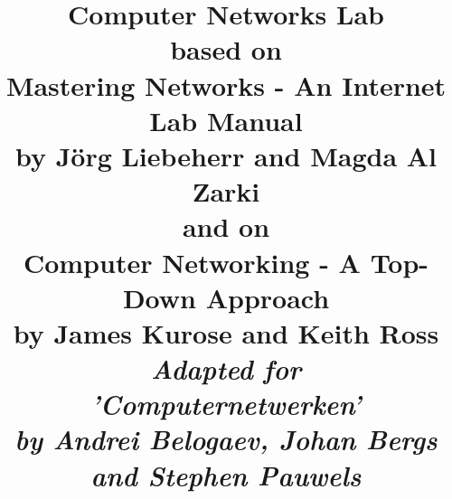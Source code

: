 \usepackage{a4wide}
\usepackage[printonlyused]{acronym}
\usepackage{amsmath}
\usepackage{amssymb}
\usepackage{array}
\usepackage{boxedminipage}
\usepackage{calc}
\usepackage{cite}
\usepackage{color}
\usepackage[inline]{enumitem}
\usepackage{fancyvrb}
\usepackage[draft]{fixme}
\usepackage[T1]{fontenc}
\usepackage{framed}
\usepackage{ifthen}
\usepackage{xifthen}
\usepackage{forloop}
\usepackage[pdftex]{graphicx}
\usepackage{helvet}
\usepackage[colorlinks,linkcolor=black,urlcolor=blue]{hyperref}
\usepackage{listings}
\usepackage{longtable}
\usepackage{ifthen}
\usepackage{listings}
\usepackage{longtable}
\usepackage{multirow}
\usepackage{subfig}
\usepackage{tikz}
\usepackage{titlesec}
\usepackage{verbatim}
\usepackage{xspace}
\usepackage{import}
\usepackage{standalone}
\usepackage{accsupp}
\usepackage{dirtree}

\setlength{\parindent}{0pt}

\title{
	\textbf{Computer Networks Lab\\ \vspace{5mm} based on \vspace{1mm} \\ Mastering Networks - An Internet Lab Manual\\
		by J\"{o}rg Liebeherr and Magda Al Zarki \\ \vspace{5mm} and on \vspace{1mm} \\ Computer Networking - A Top-Down Approach \\
		by James Kurose and Keith Ross}\\
	\vspace{10mm}
	\large{\emph{Adapted for \\ 'Computernetwerken' \\
			by Andrei Belogaev, Johan Bergs and Stephen Pauwels}} \\
}

\providecommand{\texroot}{.}
\newcommand{\images}{\texroot/images}

\newcommand{\labdir}{\texroot/Lab\thechapter}

\renewcommand{\chaptername}{Lab}
\newcommand{\stress}[1]{\emph{\textbf{#1}}} 
\newcommand{\incommand}[1]{\texttt{#1}}
\newcommand{\ipaddr}[1]{\texttt{#1}}

